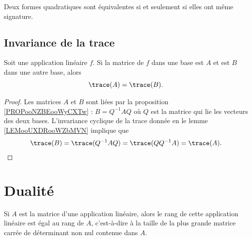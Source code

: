 \begin{proposition}
    Deux formes quadratiques sont équivalentes si et seulement si elles ont même signature.
\end{proposition}


\subsection{Invariance de la trace}

\begin{proposition}      \label{PROPooRMYQooWkEpJJ}
    Soit une application linéaire \( f\). Si la matrice de \( f\) dans une base est \( A\) et est \( B\) dans une autre base, alors
    \begin{equation}
        \trace(A)=\trace(B).
    \end{equation}
\end{proposition}

\begin{proof}
    Les matrices \( A\) et \( B\) sont liées par la proposition \ref{PROPooNZBEooWyCXTw} : \( B=Q^{-1}AQ\) où \( Q\) est la matrice qui lie les vecteurs des deux bases. L'invariance cyclique de la trace donnée en le lemme \ref{LEMooUXDRooWZbMVN} implique que
    \begin{equation}
        \trace(B)=\trace(Q^{-1}AQ)=\trace(QQ^{-1}A)=\trace(A).
    \end{equation}
\end{proof}

\section{Dualité}

\begin{proposition} \label{PropEJBZooTNFPRj}
    Si \( A\) est la matrice d'une application linéaire, alors le rang de cette application linéaire est égal au rang de \( A \), c'est-à-dire à la taille de la plus grande matrice carrée de déterminant non nul contenue dans \( A\).
\end{proposition}

